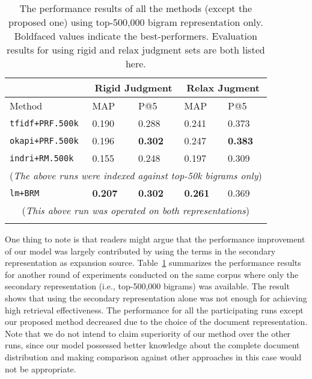 \begin{table}[ht!]
  \centering
  \begin{tabular}{p{3cm}p{1.5cm}p{1.5cm}p{1.5cm}p{1.5cm}}
    & \multicolumn{2}{c}{Rigid Judgment} & \multicolumn{2}{c}{Relax Jugment} \\
    \hline
    Method & MAP & P@5 & MAP & P@5 \\
    \hline
    {\tt tfidf+PRF.500k} & 0.190 & 0.288 & 0.241 & 0.373 \\
    {\tt okapi+PRF.500k} & 0.196 & {\bf 0.302} & 0.247 & {\bf 0.383} \\
    {\tt indri+RM.500k} & 0.155 & 0.248 & 0.197 & 0.309 \\
    \multicolumn{5}{c}{({\it The above runs were indexed against top-50k bigrams only})} \\
    \hline
    {\tt lm+BRM} & {\bf 0.207} & {\bf 0.302} & {\bf 0.261} & 0.369 \\
    \multicolumn{5}{c}{({\it This above run was operated on both representations})} \\
    \\
  \end{tabular}
  \caption{The performance results of all the methods (except the proposed one)
  using top-500,000 bigram representation only.  Boldfaced values indicate the
  best-performers.  Evaluation results for using rigid and relax judgment sets
  are both listed here.} \label{t:retrieval.500k}
\end{table}

One thing to note is that readers might argue that the performance improvement
of our model was largely contributed by using the terms in the secondary
representation as expansion source.  Table~\ref{t:retrieval.500k} summarizes
the performance results for another round of experiments conducted on the same
corpus where only the secondary representation (i.e., top-500,000 bigrams) was
available.  The result shows that using the secondary representation alone was
not enough for achieving high retrieval effectiveness.  The performance for all
the participating runs except our proposed method decreased due to the choice
of the document representation.  Note that we do not intend to claim
superiority of our method over the other runs, since our model possessed better
knowledge about the complete document distribution and making comparison
against other approaches in this case would not be appropriate.

